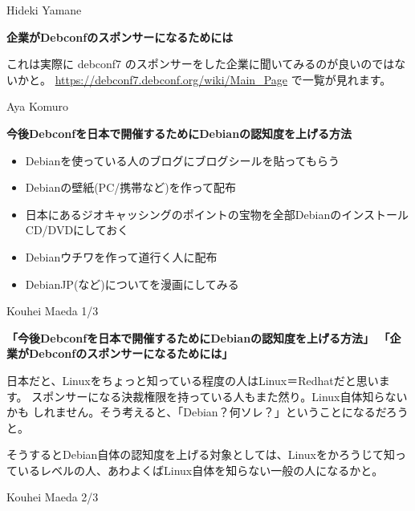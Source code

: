 \documentclass[cjk,dvipdfmx,12pt]{beamer}
\begin{document}
\begin{frame}{Hideki Yamane}

\textbf{企業がDebconfのスポンサーになるためには}

これは実際に debconf7 のスポンサーをした企業に聞いてみるのが良いのではないかと。
\url{https://debconf7.debconf.org/wiki/Main_Page} で一覧が見れます。


\end{frame}\begin{frame}{Aya Komuro}


\textbf{今後Debconfを日本で開催するためにDebianの認知度を上げる方法}

\begin{itemize}
 \item  Debianを使っている人のブログにブログシールを貼ってもらう
 \item  Debianの壁紙(PC/携帯など)を作って配布
 \item  日本にあるジオキャッシングのポイントの宝物を全部Debianのインストール
 CD/DVDにしておく
 \item  Debianウチワを作って道行く人に配布
 \item  DebianJP(など)についてを漫画にしてみる
\end{itemize}


\end{frame}\begin{frame}{Kouhei Maeda 1/3}

\textbf{「今後Debconfを日本で開催するためにDebianの認知度を上げる方法」
「企業がDebconfのスポンサーになるためには」}

日本だと、Linuxをちょっと知っている程度の人はLinux＝Redhatだと思います。
スポンサーになる決裁権限を持っている人もまた然り。Linux自体知らないかも
しれません。そう考えると、「Debian？何ソレ？」ということになるだろうと。

そうするとDebian自体の認知度を上げる対象としては、Linuxをかろうじて知っているレベルの人、あわよくばLinux自体を知らない一般の人になるかと。

\end{frame}\begin{frame}{Kouhei Maeda 2/3}


\end{frame}
\end{document}

